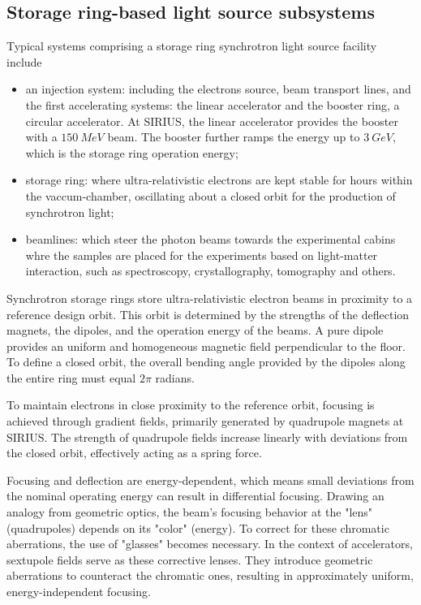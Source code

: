 \subsection{Storage ring-based light source subsystems}
Typical systems comprising a storage ring synchrotron light source facility include
\begin{itemize}
    \item an injection system: including the electrons source, beam transport lines, and the first accelerating systems: the linear accelerator and the booster ring, a circular accelerator. At SIRIUS, the linear accelerator provides the booster with a $150~\unit{MeV}$ beam. The booster further ramps the energy up to $3~\unit{GeV}$, which is the storage ring operation energy;
    \item storage ring: where ultra-relativistic electrons are kept stable for hours within the vaccum-chamber, oscillating about a closed orbit for the production of synchrotron light;
    \item beamlines: which steer the photon beams towards the experimental cabins whre the samples are placed for the experiments based on light-matter interaction, such as spectroscopy, crystallography, tomography and others.
\end{itemize}

Synchrotron storage rings store ultra-relativistic electron beams in proximity to a reference design orbit. This orbit is determined by the strengths of the deflection magnets, the dipoles, and the operation energy of the beams. A pure dipole provides an uniform and homogeneous magnetic field perpendicular to the floor. To define a closed orbit, the overall bending angle provided by the dipoles along the entire ring must equal $2\pi$ radians.

To maintain electrons in close proximity to the reference orbit, focusing is achieved through gradient fields, primarily generated by quadrupole magnets at SIRIUS. The strength of quadrupole fields increase linearly with deviations from the closed orbit, effectively acting as a spring force.

Focusing and deflection are energy-dependent, which means small deviations from the nominal operating energy can result in differential focusing. Drawing an analogy from geometric optics, the beam's focusing behavior at the "lens" (quadrupoles) depends on its "color" (energy). To correct for these chromatic aberrations, the use of "glasses" becomes necessary. In the context of accelerators, sextupole fields serve as these corrective lenses. They introduce geometric aberrations to counteract the chromatic ones, resulting in approximately uniform, energy-independent focusing.

